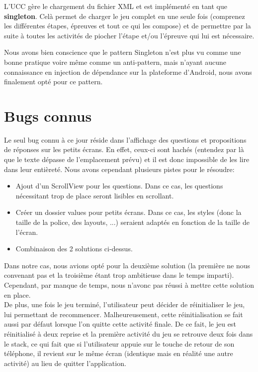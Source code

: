 \documentclass[11pt]{scrreprt}
\begin{document}
    L'UCC gère le chargement du fichier XML et est implémenté en tant que \textbf{singleton}. Celà permet de charger le jeu complet en une seule fois (comprenez les différentes étapes, épreuves et tout ce qui les compose) et de permettre par la suite à toutes les activités de piocher l'étape et/ou l'épreuve qui lui est nécessaire.

    Nous avons bien conscience que le pattern Singleton n'est plus vu comme une bonne pratique voire même comme un anti-pattern, mais n'ayant aucune connaissance en injection de dépendance sur la plateforme d'Android, nous avons finalement opté pour ce pattern.

    \chapter{Bugs connus}
    Le seul bug connu à ce jour réside dans l'affichage des questions et propositions de réponses sur les petits écrans. En effet, ceux-ci sont hachés (entendez par là que le texte dépasse de l'emplacement prévu) et il est donc impossible de les lire dans leur entièreté.
    Nous avons cependant plusieurs pistes pour le résoudre:
    \begin{itemize}
        \item Ajout d'un ScrollView pour les questions. Dans ce cas, les questions nécessitant trop de place seront lisibles en scrollant.
        \item Créer un dossier values pour petits écrans. Dans ce cas, les styles (donc la taille de la police, des layouts, ...) seraient adaptés en fonction de la taille de l'écran.
        \item Combinaison des 2 solutions ci-dessus.
    \end{itemize}
    Dans notre cas, nous avions opté pour la deuxième solution (la première ne nous convenant pas et la troisième étant trop ambitieuse dans le temps imparti). Cependant, par manque de temps, nous n'avonc pas réussi à mettre cette solution en place.\\

    De plus, une fois le jeu terminé, l'utilisateur peut décider de réinitialiser le jeu, lui permettant de recommencer. Malheureusement, cette réinitialisation se fait aussi par défaut lorsque l'on quitte cette activité finale. De ce fait, le jeu est réinitialisé à deux reprise et la première activité du jeu se retrouve deux fois dans le stack, ce qui fait que si l'utilisateur appuie sur le touche de retour de son téléphone, il revient sur le \og même\fg{} écran (identique mais en réalité une autre activité) au lieu de quitter l'application.
\end{document}

